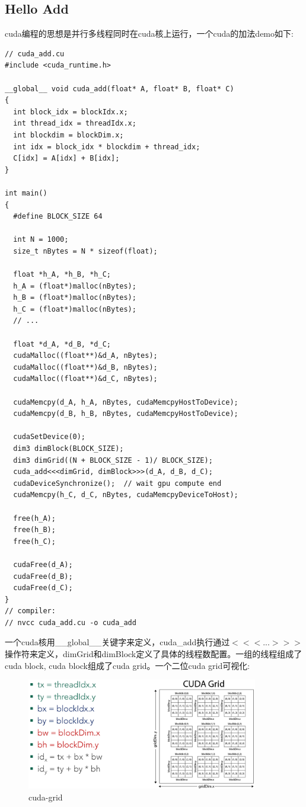 \documentclass[12pt]{book}
\begin{document}
\subsection{Hello Add}
cuda编程的思想是并行多线程同时在cuda核上运行，一个cuda的加法demo如下:
\begin{lstlisting}
// cuda_add.cu
#include <cuda_runtime.h>

__global__ void cuda_add(float* A, float* B, float* C)
{
  int block_idx = blockIdx.x;
  int thread_idx = threadIdx.x;
  int blockdim = blockDim.x;
  int idx = block_idx * blockdim + thread_idx;
  C[idx] = A[idx] + B[idx];
}

int main()
{
  #define BLOCK_SIZE 64
  
  int N = 1000;
  size_t nBytes = N * sizeof(float);

  float *h_A, *h_B, *h_C;
  h_A = (float*)malloc(nBytes);
  h_B = (float*)malloc(nBytes);
  h_C = (float*)malloc(nBytes);
  // ...
  
  float *d_A, *d_B, *d_C;
  cudaMalloc((float**)&d_A, nBytes);
  cudaMalloc((float**)&d_B, nBytes);
  cudaMalloc((float**)&d_C, nBytes);
  
  cudaMemcpy(d_A, h_A, nBytes, cudaMemcpyHostToDevice);
  cudaMemcpy(d_B, h_B, nBytes, cudaMemcpyHostToDevice);
  
  cudaSetDevice(0);
  dim3 dimBlock(BLOCK_SIZE);
  dim3 dimGrid((N + BLOCK_SIZE - 1)/ BLOCK_SIZE);
  cuda_add<<<dimGrid, dimBlock>>>(d_A, d_B, d_C);
  cudaDeviceSynchronize();  // wait gpu compute end
  cudaMemcpy(h_C, d_C, nBytes, cudaMemcpyDeviceToHost);

  free(h_A);
  free(h_B);
  free(h_C);

  cudaFree(d_A);
  cudaFree(d_B);
  cudaFree(d_C);
}
// compiler:
// nvcc cuda_add.cu -o cuda_add
\end{lstlisting}
一个cuda核用\_\_global\_\_关键字来定义，cuda\_add执行通过$<<<...>>>$操作符来定义，dimGrid和dimBlock定义了具体的线程数配置。一组的线程组成了cuda block, cuda block组成了cuda grid。一个二位cuda grid可视化:
\begin{figure}[H]
	\centering
	\includegraphics[width=0.9\textwidth]{images/cuda_grid_block.png}
	\caption{cuda-grid}
	\label{cuda-grid}
\end{figure}
\end{document}
